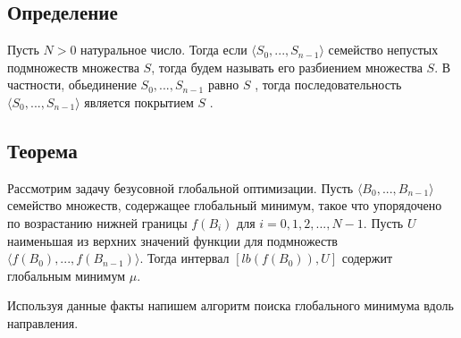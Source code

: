 \documentclass{article}
\begin{document}
    \subsection{Определение}

    Пусть $N > 0$  натуральное число. Тогда если $\langle S_0,..., S_{n-1} \rangle$ семейство непустых подмножеств множества $S$, тогда будем называть его разбиением множества $S$. В частности, обьединение $S_0,..., S_{n-1}$ равно $S$ , тогда последовательность $\langle S_0,..., S_{n-1} \rangle$ является покрытием $S$ .

    \subsection{Теорема}

    Рассмотрим задачу безусовной глобальной оптимизации. Пусть $\langle B_0,..., B_{n-1} \rangle$ семейство множеств, содержащее глобальный минимум, такое что упорядочено по возрастанию нижней границы $f(B_i)$ для $i=0, 1, 2,..., N-1$. Пусть $U$ наименьшая из верхних значений функции для подмножеств $\langle f(B_0),..., f(B_{n-1}) \rangle$. Тогда интервал $[lb(f(B_0)), U]$ содержит глобальным минимум $\mu$.


    Используя данные факты напишем алгоритм поиска глобального минимума вдоль направления.
























    \newpage
    \newpage
\end{document}
